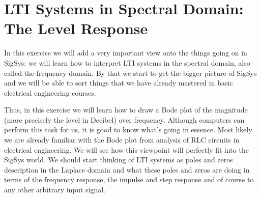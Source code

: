 
% 

\newpage
\section{LTI Systems in Spectral Domain: The Level Response}
\noindent In this exercise we will add a very important view onto the things
going on in SigSys: we will learn how to interpret LTI systems in the spectral
domain, also called the frequency domain. By that we start to get the bigger
picture of SigSys and we will be able to sort things that we have already mastered
in basic electrical engineering courses.

Thus, in this exercise we will learn how to draw a Bode plot of the
magnitude (more precisely the level in Decibel) over frequency.
Although computers can perform this task for us, it is good to
know what's going in essence.
Most likely we are already familiar with the Bode plot from analysis of RLC
circuits in electrical engineering. We will see how this viewpoint will
perfectly fit into the SigSys world. We should start thinking of LTI systems as
poles and zeros description in the Laplace domain and what these poles and zeros
are doing in terms of the frequency response, the impulse and step response and
of course to any other arbitrary input signal.

